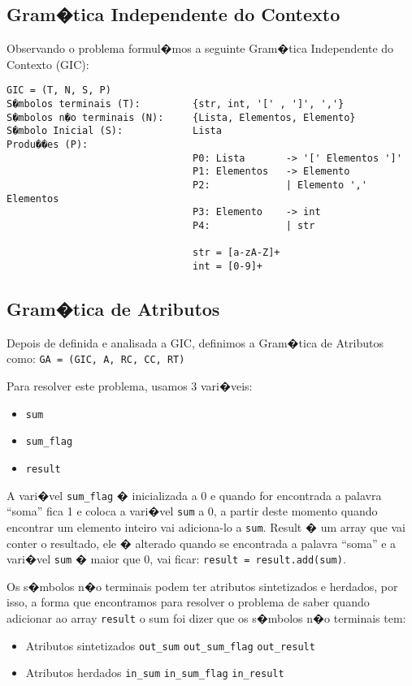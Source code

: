\documentclass[a4paper]{article}
\begin{document}
\subsection{Gram�tica Independente do Contexto}
Observando o problema formul�mos a seguinte Gram�tica Independente do Contexto (GIC):
\begin{verbatim}
GIC = (T, N, S, P)
S�mbolos terminais (T):         {str, int, '[' , ']', ','}
S�mbolos n�o terminais (N):     {Lista, Elementos, Elemento}
S�mbolo Inicial (S):            Lista
Produ��es (P):
                                P0: Lista       -> '[' Elementos ']'
                                P1: Elementos   -> Elemento 
                                P2:             | Elemento ',' Elementos
                                P3: Elemento    -> int
                                P4:             | str

                                str = [a-zA-Z]+
                                int = [0-9]+
\end{verbatim}

\subsection{Gram�tica de Atributos}
 Depois de definida e analisada a GIC, definimos a Gram�tica de Atributos como:
\verb|GA = (GIC, A, RC, CC, RT)|    

Para resolver este problema, usamos 3 vari�veis:
\begin{itemize}
\item \verb|sum|
\item \verb|sum_flag|
\item \verb|result|
\end{itemize}

A vari�vel \verb|sum_flag| � inicializada a 0 e quando for encontrada a palavra ``soma'' 
fica 1 e coloca a vari�vel \verb|sum| a 0, a partir deste momento quando encontrar um elemento inteiro 
vai adiciona-lo a \verb|sum|.
Result � um array que vai conter o resultado, ele � alterado quando se encontrada a palavra ``soma'' 
e a vari�vel \verb|sum| � maior que 0, vai ficar: \verb|result = result.add(sum)|.

Os s�mbolos n�o terminais podem ter atributos sintetizados e herdados, por isso, a forma que encontramos 
para resolver o problema de saber quando adicionar ao array \verb|result| o sum foi dizer que os s�mbolos n�o terminais tem:
\begin{itemize}
 \item Atributos sintetizados
 \subitem \verb|out_sum|
 \subitem \verb|out_sum_flag|
 \subitem \verb|out_result|
 \item Atributos herdados
 \subitem \verb|in_sum|
 \subitem \verb|in_sum_flag|
 \subitem \verb|in_result|
\end{itemize}
\end{document}

